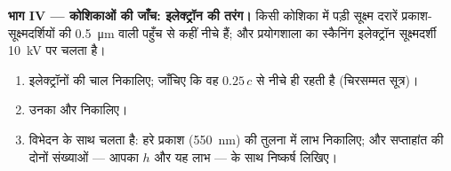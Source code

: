 \begin{problem}
\medskip
\noindent\textbf{भाग IV --- कोशिकाओं की जाँच: इलेक्ट्रॉन की तरंग।}
किसी कोशिका में पड़ी सूक्ष्म दरारें प्रकाश-सूक्ष्मदर्शियों की \qty{0.5}{\micro m} वाली पहुँच
से कहीं नीचे हैं; और प्रयोगशाला का स्कैनिंग इलेक्ट्रॉन सूक्ष्मदर्शी \qty{10}{kV} पर
चलता है।
\begin{enumerate}[resume]
  \item इलेक्ट्रॉनों की चाल निकालिए; जाँचिए कि वह $0.25\,c$ से नीचे ही रहती है
        (चिरसम्मत सूत्र)।
  \item उनका  और  निकालिए।
  \item विभेदन  के साथ चलता है: हरे प्रकाश (\qty{550}{nm}) की
        तुलना में लाभ निकालिए; और सप्ताहांत की दोनों संख्याओं --- आपका $h$
        और यह लाभ --- के साथ निष्कर्ष लिखिए।
\end{enumerate}
\end{problem}
